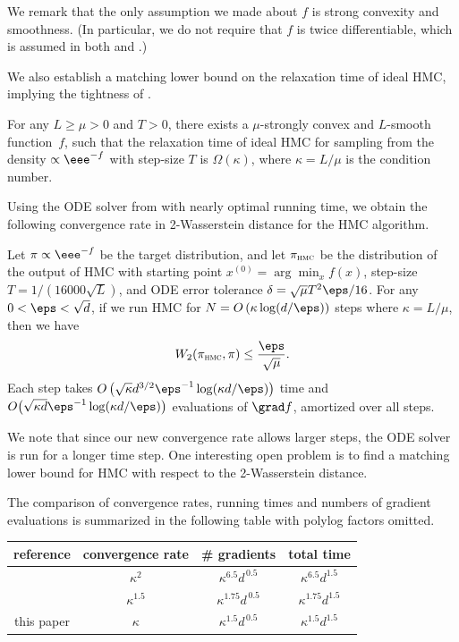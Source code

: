 We remark that the only assumption we made about $f$ is strong convexity and
%
smoothness. (In particular,  %
we do not require that $f$ is twice differentiable, which is assumed in both \cite{LSV18} and \cite{MS17}.)   %

We also establish a matching lower bound on the relaxation time of ideal HMC, implying the tightness of . 
\begin{theorem}\label{thm:rel_lower}
	For any $L \ge \mu > 0$ and $T>0$, there exists a $\mu$-strongly convex and $L$-smooth function~$f$, such that the relaxation time of ideal HMC for sampling from the density $\propto \eee^{-f}$ with step-size $T$ is $\Omega(\kappa)$, where $\kappa = L/\mu$ is the condition number. 
\end{theorem}

Using the ODE solver from \cite{LSV18} with nearly optimal running time, we obtain the following convergence rate in 2-Wasserstein distance for the HMC algorithm. 
%
\begin{theorem}
	\label{thm:mixing}
	Let $\pi \propto \eee^{-f}$ be the target distribution, and let $\pi_{\textsc{hmc}}$ be the distribution of the output of HMC with starting point $x^{(0)} = \arg\min_x f(x)$, step-size $T = 1/(16000\sqrt{L})$, and 
	ODE error tolerance $\delta = \sqrt{\mu}T^2 \eps/16$.
	For any $0<\eps<\sqrt{d}$, if we run HMC for $N = O\left( \kappa \log(d/\eps) \right)$ steps where $\kappa = L/\mu$, then we have 
	\begin{equation}
	W_2(\pi_{\textsc{hmc}},\pi) \le \frac{\eps}{\sqrt{\mu}}.
	\end{equation}
	Each step takes $O\left( \sqrt{\kappa}d^{3/2}\eps^{-1} \log(\kappa d/\eps) \right)$ time and $O\big( \sqrt{\kappa d}\eps^{-1} \log(\kappa d/\eps) \big)$ evaluations of $\grad f$, amortized over all steps.
\end{theorem}
We note that since our new convergence rate allows larger steps, the ODE solver is run for a longer time step. 
One interesting open problem is to find a matching lower bound for HMC with respect to the 2-Wasserstein distance. 

The comparison of convergence rates, running times and numbers of gradient evaluations is summarized in the following table with polylog factors omitted. 

\begin{center}
{\renewcommand{\arraystretch}{1.3}%
	\begin{tabular}{c|c|c|c}
	\hline
	reference & convergence rate & \# gradients & total time\\
	\hline
\cite{MS17} & $\kappa^2$ & $\kappa^{6.5} d^{\,0.5}$  & $\kappa^{6.5} d^{1.5}$ \\
\cite{LSV18} & $\kappa^{1.5}$ & $\kappa^{1.75} d^{\,0.5}$ &  $\kappa^{1.75} d^{1.5}$ \\
this paper & $\kappa$ & $\kappa^{1.5} d^{\,0.5}$ & $\kappa^{1.5} d^{1.5}$\\
\hline
\end{tabular}
	}
\end{center}

